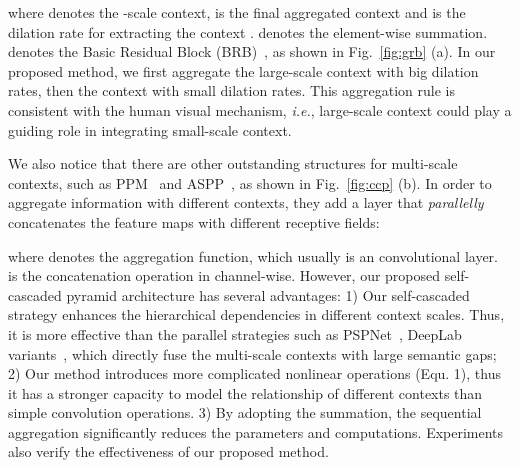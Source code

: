 \documentclass[10pt,twocolumn,letterpaper]{article}
\begin{document}
where  denotes the -scale context,  is the final aggregated context and  is the dilation rate for extracting the context .
 denotes the element-wise summation.  denotes the Basic Residual Block (BRB)~\cite{he2016deep}, as shown in Fig.~\ref{fig:grb} (a).
In our proposed method, we first aggregate the large-scale context with big dilation rates, then the context with small dilation rates.
This aggregation rule is consistent with the human visual mechanism, \emph{i.e.}, large-scale context could play a guiding role in integrating small-scale context.

We also notice that there are other outstanding structures for multi-scale contexts, such as PPM~\cite{zhao2017pyramid} and ASPP~\cite{chen2018deeplab}, as shown in Fig.~\ref{fig:ccp} (b).
In order to aggregate information with different contexts, they add a layer that \emph{parallelly} concatenates the feature maps with different receptive fields:

where  denotes the aggregation function, which usually is an  convolutional layer.
 is the concatenation operation in channel-wise.
However, our proposed self-cascaded pyramid architecture has several advantages:
1) Our self-cascaded strategy enhances the hierarchical dependencies in different context scales. Thus, it is more effective than the parallel strategies such as PSPNet~\cite{zhao2017pyramid}, DeepLab variants~\cite{chen2018deeplab},
which directly fuse the multi-scale contexts with large semantic gaps;
2) Our method introduces more complicated nonlinear operations (Equ. 1), thus it has a stronger capacity to model the relationship of different contexts than simple convolution operations.
3) By adopting the summation, the sequential aggregation significantly reduces the parameters and computations.
Experiments also verify the effectiveness of our proposed method.
\end{document}
